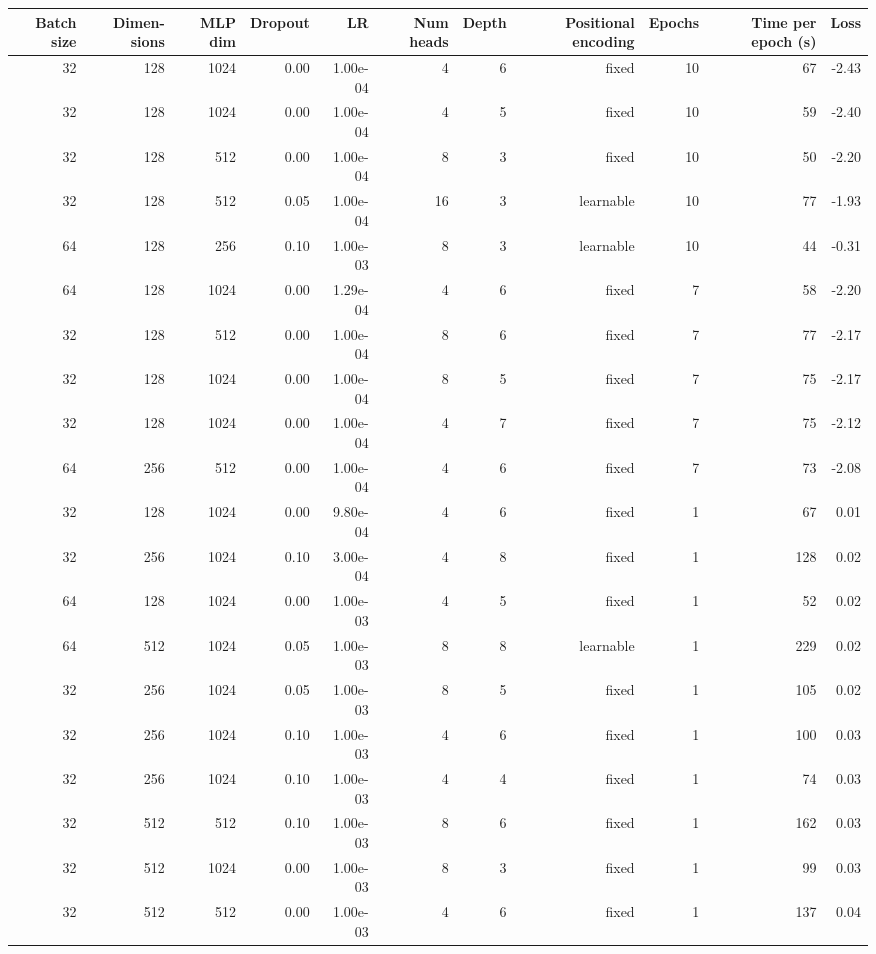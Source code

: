 \begin{appendices}
\begin{table}
\begin{tabular}{rrrrrrrrrrr}
\multicolumn{1}{p{0.5cm}}{\raggedleft Batch size} & 
\multicolumn{1}{p{1.0cm}}{\raggedleft Dimen-sions} & 
\multicolumn{1}{p{0.5cm}}{\raggedleft MLP dim} & 
\multicolumn{1}{p{1.0cm}}{\raggedleft Dropout} & 
\multicolumn{1}{p{0.5cm}}{\raggedleft LR} & 
\multicolumn{1}{p{0.5cm}}{\raggedleft Num heads} & 
\multicolumn{1}{p{0.5cm}}{\raggedleft Depth} & 
\multicolumn{1}{p{1.5cm}}{\raggedleft Positional encoding} & 
\multicolumn{1}{p{1.0cm}}{\raggedleft Epochs} &
\multicolumn{1}{p{1.5cm}}{\raggedleft Time per epoch (s)} & 
\multicolumn{1}{p{0.5cm}}{\raggedleft Loss} \\

\midrule
32 & 128 & 1024 & 0.00 & 1.00e-04 & 4 & 6 & fixed & 10 & 67 & -2.43 \\
32 & 128 & 1024 & 0.00 & 1.00e-04 & 4 & 5 & fixed & 10 & 59 & -2.40 \\
32 & 128 & 512 & 0.00 & 1.00e-04 & 8 & 3 & fixed & 10 & 50 & -2.20 \\
32 & 128 & 512 & 0.05 & 1.00e-04 & 16 & 3 & learnable & 10 & 77 & -1.93 \\
64 & 128 & 256 & 0.10 & 1.00e-03 & 8 & 3 & learnable & 10 & 44 & -0.31 \\
64 & 128 & 1024 & 0.00 & 1.29e-04 & 4 & 6 & fixed & 7 & 58 & -2.20 \\
32 & 128 & 512 & 0.00 & 1.00e-04 & 8 & 6 & fixed & 7 & 77 & -2.17 \\
32 & 128 & 1024 & 0.00 & 1.00e-04 & 8 & 5 & fixed & 7 & 75 & -2.17 \\
32 & 128 & 1024 & 0.00 & 1.00e-04 & 4 & 7 & fixed & 7 & 75 & -2.12 \\
64 & 256 & 512 & 0.00 & 1.00e-04 & 4 & 6 & fixed & 7 & 73 & -2.08 \\
\midrule
32 & 128 & 1024 & 0.00 & 9.80e-04 & 4 & 6 & fixed & 1 & 67 & 0.01 \\
32 & 256 & 1024 & 0.10 & 3.00e-04 & 4 & 8 & fixed & 1 & 128 & 0.02 \\
64 & 128 & 1024 & 0.00 & 1.00e-03 & 4 & 5 & fixed & 1 & 52 & 0.02 \\
64 & 512 & 1024 & 0.05 & 1.00e-03 & 8 & 8 & learnable & 1 & 229 & 0.02 \\
32 & 256 & 1024 & 0.05 & 1.00e-03 & 8 & 5 & fixed & 1 & 105 & 0.02 \\
32 & 256 & 1024 & 0.10 & 1.00e-03 & 4 & 6 & fixed & 1 & 100 & 0.03 \\
32 & 256 & 1024 & 0.10 & 1.00e-03 & 4 & 4 & fixed & 1 & 74 & 0.03 \\
32 & 512 & 512 & 0.10 & 1.00e-03 & 8 & 6 & fixed & 1 & 162 & 0.03 \\
32 & 512 & 1024 & 0.00 & 1.00e-03 & 8 & 3 & fixed & 1 & 99 & 0.03 \\
32 & 512 & 512 & 0.00 & 1.00e-03 & 4 & 6 & fixed & 1 & 137 & 0.04 \\
\bottomrule
\end{tabular}
\end{table}


\end{appendices}

